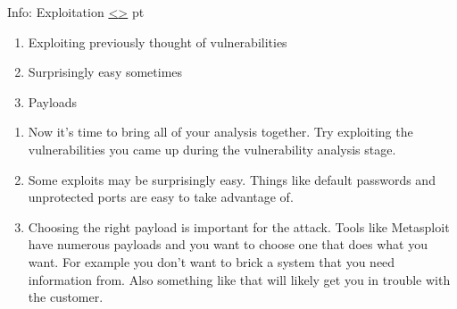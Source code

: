 \documentclass[12pt]{extarticle}
\newenvironment{instructionblock}{\Large\bgroup}{\egroup}
\newcounter{next}
\newcounter{prev}
\begin{document}
\pagebreak
{}
\begin{slide}{Info: Exploitation}
{\hyperref[slide \theprev]{\textless}\hyperref[slide \thenext]{\textgreater}}
	 pt
	\begin{instructionblock}
		\begin{enumerate}
            \item Exploiting previously thought of vulnerabilities
            \item Surprisingly easy sometimes
            \item Payloads
		\end{enumerate}
	\end{instructionblock}
\end{slide}
\begin{enumerate}
\item Now it's time to bring all of your analysis together. Try exploiting the vulnerabilities you came up during the vulnerability analysis stage. \cite[Chapter 8]{Ref:Weidman}
\item Some exploits may be surprisingly easy. Things like default passwords and unprotected ports are easy to take advantage of. \cite[Chapter 8]{Ref:Weidman}
\item Choosing the right payload is important for the attack. Tools like Metasploit have numerous payloads and you want to choose one that does what you want. For example you don't want to brick a system that you need information from. Also something like that will likely get you in trouble with the customer. \cite[Chapter 8]{Ref:Weidman}
\end{enumerate}
\end{document}
